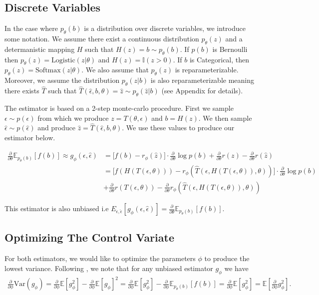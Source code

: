 \documentclass{article}
\newcommand{\E}{\mathbb{E}}
\newcommand{\PT}{\frac{\partial}{\partial \theta}}
\newcommand{\PPH}{\frac{\partial}{\partial \phi}}
\newcommand{\LP}[1]{\PT \log p(#1)}
\begin{document}
\subsection{Discrete Variables}
In the case where $p_\theta(b)$ is a distribution over discrete variables, we introduce some notation. We assume there exist a continuous distribution $p_\theta(z)$ and a determanistic mapping $H$ such that $H(z) = b \sim p_\theta(b)$. If $p(b)$ is Bernoulli then $p_\theta(z) = \text{Logistic}(z|\theta)$ and $H(z) = \mathbb{I}(z>0)$. If $b$ is Categorical, then $p_\theta(z) = \text{Softmax}(z|\theta)$. We also assume that $p_\theta(z)$ is reparameterizable. Moreover, we assume the distribution $p_\theta(z|b)$ is also reparameterizable meaning there exists $\hat{T}$ such that $\hat{T}(\hat{\epsilon}, b, \theta) = \hat{z} \sim p_\theta(\hat{z}|b)$ (see Appendix for details).  

The estimator is based on a 2-step monte-carlo procedure. First we sample $\epsilon \sim p(\epsilon)$ from which we produce $z = T(\theta, \epsilon)$ and $b = H(z)$. We then sample $\hat{\epsilon} \sim p(\hat{\epsilon})$ and produce $\hat{z} = \hat{T}(\hat{\epsilon}, b, \theta)$. We use these values to produce our estimator below.

\begin{align}
\PT\E_{p_\theta(b)}[f(b)] \approx g_\phi(\epsilon,\hat{\epsilon}) &= \Big[f(b) - r_\phi(\hat{z})\Big]\cdot\LP{b} + \PT r(z) - \PT r(\hat{z})\\
&= \Big[f(H(T(\epsilon, \theta))) - r_\phi(\hat{T}(\epsilon, H(T(\epsilon, \theta)), \theta))\Big]\cdot\LP{b}\\ 
&+ \PT r(T(\epsilon, \theta)) - \PT r_\phi(\hat{T}(\epsilon, H(T(\epsilon, \theta)), \theta))
\end{align}

This estimator is also unbiased i.e $E_{\epsilon, \hat{\epsilon}}[g_\phi(\epsilon, \hat{\epsilon})] = \PT\E_{p_\theta(b)}[f(b)]$.

\subsection{Optimizing The Control Variate}
For both estimators, we would like to optimize the parameters $\phi$ to produce the lowest variance. Following \cite{tucker2017rebar}, we note that for any unbiased estimator $g_\phi$ we have 
\begin{align}
\PPH \text{Var}(g_\phi) = \PPH \E[g_\phi^2] - \PPH \E[g_\phi]^2
= \PPH \E[g_\phi^2] - \PPH \E_{p_\theta(b)}[f(b)]
= \PPH \E[g_\phi^2] = \E \left[ \PPH g_\phi^2 \right].
\end{align}
\end{document}
